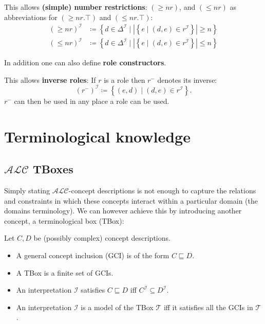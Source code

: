 \begin{definition*}
	This allows \textbf{(simple) number restrictions}:
	$\left( \geq nr \right)$, and $\left( \leq nr \right)$ as abbreviations for $\left( \geq nr.\top \right)$ and $\left( \leq nr.\top \right)$:
	\begin{align*}
		\left( \geq nr \right) ^{\mathcal{I}} &\coloneqq \left\{ d \in \Delta^{\mathcal{I}} \mid \left| \left\{ e \mid (d,e) \in r^{\mathcal{I}} \right\}  \right| \geq n \right\} \\
		\left( \leq nr \right) ^{\mathcal{I}} &\coloneqq \left\{ d \in \Delta^{\mathcal{I}} \mid \left| \left\{ e \mid (d,e) \in r^{\mathcal{I}} \right\}  \right| \leq n \right\} 
	\end{align*}
\end{definition*}

In addition one can also define \textbf{role constructors}.
\begin{definition*}
	This allows \textbf{inverse roles}:
	If $r$ is a role then $r^{-}$ denotes its inverse:
	\[
		\left( r^{-} \right) ^{\mathcal{I}} \coloneqq \left\{ (e,d) \mid (d,e) \in r^{\mathcal{I}} \right\} 
	.\] 
	$r^{-}$ can then be used in any place a role can be used.
\end{definition*}

\newpage
\section{Terminological knowledge}
\subsection{$\mathcal{ALC}$ TBoxes}
Simply stating $\mathcal{ALC}$-concept descriptions is not enough to capture the relations and constraints in which these concepts interact within a particular domain (the domains terminology).
We can however achieve this by introducing another concept, a terminological box (TBox):

\begin{definition}
	Let $C, D$ be (possibly complex) concept descriptions.
	\begin{itemize}
		\item A general concept inclusion (GCI) is of the form $C \sqsubseteq D$.
		\item A TBox is a finite set of GCIs.
		\item An interpretation $\mathcal{I}$ satisfies $C \sqsubseteq D$ iff $C^{\mathcal{I}} \subseteq D^{\mathcal{I}}$.
		\item An interpretation $\mathcal{I}$ is a model of the TBox $\mathcal{T}$ iff it satisfies all the GCIs in $\mathcal{T}$.
	\end{itemize}
\end{definition}

